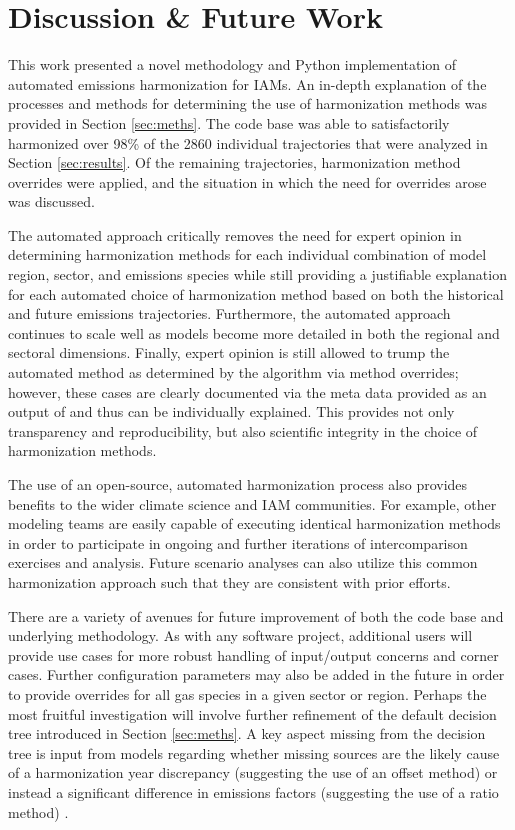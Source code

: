 \section{Discussion \& Future Work}\label{sec:future}

This work presented a novel methodology and Python implementation of automated
emissions harmonization for IAMs. An in-depth explanation of the processes and
methods for determining the use of harmonization methods was provided in Section
\ref{sec:meths}. The  code base was able to satisfactorily
harmonized over 98\% of the 2860 individual trajectories that were analyzed in
Section \ref{sec:results}. Of the remaining trajectories, harmonization method
overrides were applied, and the situation in which the need for overrides arose
was discussed.

The automated approach critically removes the need for expert opinion in
determining harmonization methods for each individual combination of model
region, sector, and emissions species while still providing a justifiable
explanation for each automated choice of harmonization method based on both the
historical and future emissions trajectories. Furthermore, the automated
approach continues to scale well as models become more detailed in both the
regional and sectoral dimensions. Finally, expert opinion is still allowed to
trump the automated method as determined by the algorithm via method overrides;
however, these cases are clearly documented via the meta data provided as an
output of  and thus can be individually explained. This provides
not only transparency and reproducibility, but also scientific integrity in the
choice of harmonization methods.

The use of an open-source, automated harmonization process also provides
benefits to the wider climate science and IAM communities. For example, other
modeling teams are easily capable of executing identical harmonization methods
in order to participate in ongoing and further iterations of intercomparison
exercises and analysis. Future scenario analyses can also utilize this common
harmonization approach such that they are consistent with prior efforts.

There are a variety of avenues for future improvement of both the 
code base and underlying methodology. As with any software project, additional
users will provide use cases for more robust handling of input/output concerns
and corner cases. Further configuration parameters may also be added in the
future in order to provide overrides for all gas species in a given sector or
region. Perhaps the most fruitful investigation will involve further refinement
of the default decision tree introduced in Section \ref{sec:meths}. A key aspect
missing from the decision tree is input from models regarding whether missing
sources are the likely cause of a harmonization year discrepancy (suggesting the
use of an offset method) or instead a significant difference in emissions
factors (suggesting the use of a ratio method) \cite{rogelj_discrepancies_2011}.

